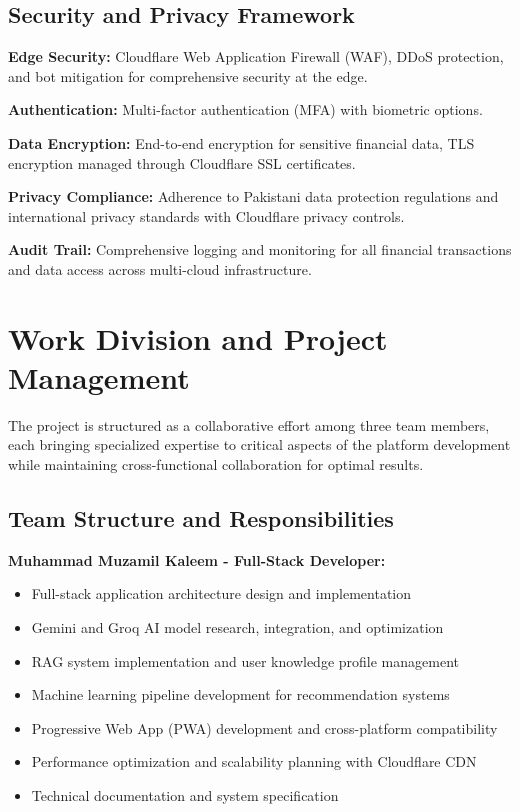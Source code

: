 \documentclass[12pt]{article}
\begin{document}
\subsection{Security and Privacy Framework}

\textbf{Edge Security:} Cloudflare Web Application Firewall (WAF), DDoS protection, and bot mitigation for comprehensive security at the edge.

\textbf{Authentication:} Multi-factor authentication (MFA) with biometric options.

\textbf{Data Encryption:} End-to-end encryption for sensitive financial data, TLS encryption managed through Cloudflare SSL certificates.

\textbf{Privacy Compliance:} Adherence to Pakistani data protection regulations and international privacy standards with Cloudflare privacy controls.

\textbf{Audit Trail:} Comprehensive logging and monitoring for all financial transactions and data access across multi-cloud infrastructure.

\section{Work Division and Project Management}
The project is structured as a collaborative effort among three team members, each bringing specialized expertise to critical aspects of the platform development while maintaining cross-functional collaboration for optimal results.

\subsection{Team Structure and Responsibilities}

\textbf{Muhammad Muzamil Kaleem - Full-Stack Developer:}
\begin{itemize}
    \item Full-stack application architecture design and implementation
    \item Gemini and Groq AI model research, integration, and optimization
    \item RAG system implementation and user knowledge profile management
    \item Machine learning pipeline development for recommendation systems
    \item Progressive Web App (PWA) development and cross-platform compatibility
    \item Performance optimization and scalability planning with Cloudflare CDN
    \item Technical documentation and system specification
\end{itemize}
\end{document}
